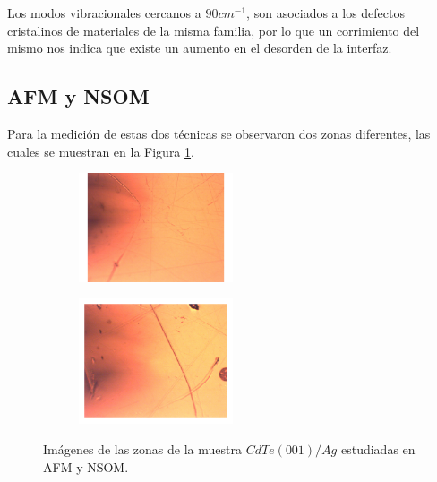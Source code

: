 Los modos vibracionales cercanos a $90 cm^{-1}$, son asociados a los defectos cristalinos de materiales de la misma familia\cite{Qiu2021}, por lo que un corrimiento del mismo nos indica que existe un aumento en el desorden de la interfaz.

\subsection{AFM y NSOM}
\label{sec:ch4-cdte-afm-nsom}
Para la medición de estas dos técnicas se observaron dos zonas diferentes, las cuales se muestran en la 
Figura \ref{fig:afm-zones}.

\begin{figure}[H]
    \centering
    \begin{subfigure}[b]{0.48\textwidth}
        \centering
        \includegraphics[width = 0.5\textwidth]{figures/chap4/cdte-ag/afm-nsom-results/CdTe_Ag_Zona1_10X.pdf}
    \end{subfigure}\hfill
    \begin{subfigure}[b]{0.48\textwidth}
        \centering
        \includegraphics[width = 0.5\textwidth]{figures/chap4/cdte-ag/afm-nsom-results/CdTe_Ag_Zona2_10X.pdf}
    \end{subfigure}
\caption{Imágenes de las zonas de la muestra $ CdTe(001)/Ag $ estudiadas en AFM y NSOM.}
\label{fig:afm-zones}
\end{figure}

